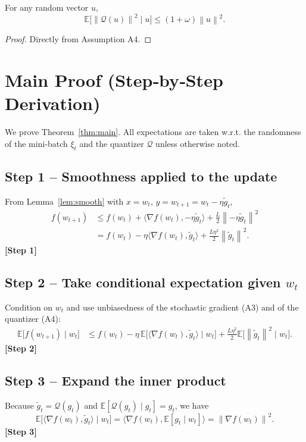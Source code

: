 \documentclass{article}
\newcommand{\E}{\mathbb{E}}
\newcommand{\norm}[1]{\left\lVert #1\right\rVert}
\newcommand{\ip}[2]{\langle #1,#2\rangle}
\newcommand{\Q}{\mathcal{Q}}
\newcommand{\grad}{\nabla}
\begin{document}
\begin{lemma}\label{lem:quant}
For any random vector $u$,
\[
\E\!\big[\norm{\Q(u)}^2\mid u\big]\le (1+\omega)\norm{u}^2 .
\]
\end{lemma}
\begin{proof}
Directly from Assumption A4. \qedhere
\end{proof}

\section*{Main Proof (Step‑by‑Step Derivation)}
We prove Theorem~\ref{thm:main}. All expectations are taken w.r.t. the randomness of the mini‑batch $\xi_t$ and the quantizer $\Q$ unless otherwise noted.

\subsection*{Step 1 – Smoothness applied to the update}
From Lemma~\ref{lem:smooth} with $x=w_t$, $y=w_{t+1}=w_t-\eta\tilde g_t$,
\begin{align}
f(w_{t+1})
&\le f(w_t)+\ip{\grad f(w_t)}{-\eta\tilde g_t}
   +\frac{L}{2}\norm{-\eta\tilde g_t}^2 \nonumber\\
&= f(w_t)-\eta\ip{\grad f(w_t)}{\tilde g_t}
   +\frac{L\eta^2}{2}\norm{\tilde g_t}^2 .
\tag{3}
\end{align}
\textbf{[Step 1]}

\subsection*{Step 2 – Take conditional expectation given $w_t$}
Condition on $w_t$ and use unbiasedness of the stochastic gradient (A3) and of the quantizer (A4):
\begin{align}
\E\!\big[f(w_{t+1})\mid w_t\big]
&\le f(w_t)-\eta\,\E\!\big[\ip{\grad f(w_t)}{\tilde g_t}\mid w_t\big]
   +\frac{L\eta^2}{2}\E\!\big[\norm{\tilde g_t}^2\mid w_t\big] .
\tag{4}
\end{align}
\textbf{[Step 2]}

\subsection*{Step 3 – Expand the inner product}
Because $\tilde g_t=\Q(g_t)$ and $\E[\Q(g_t)\mid g_t]=g_t$, we have
\[
\E\!\big[\ip{\grad f(w_t)}{\tilde g_t}\mid w_t\big]
 =\ip{\grad f(w_t)}{\E[g_t\mid w_t]}
 =\norm{\grad f(w_t)}^2 .
\tag{5}
\]
\textbf{[Step 3]}
\end{document}
